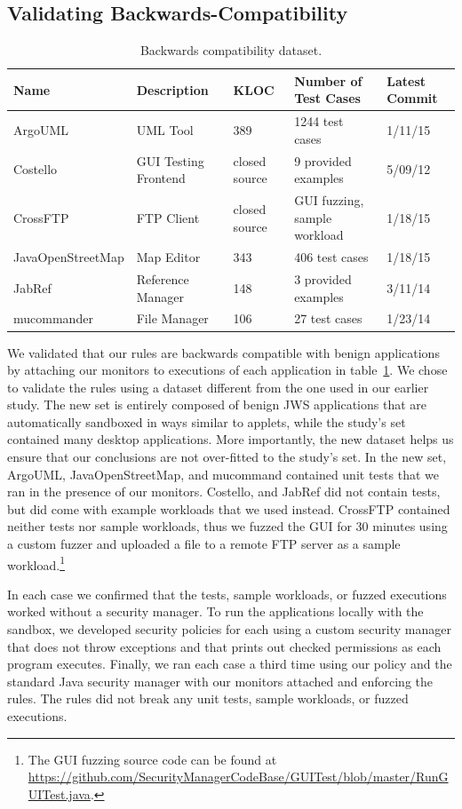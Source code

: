 \documentclass{sig-alternate}
\begin{document}
\subsection{Validating Backwards-Compatibility}\label{sec:backcompat}
\begin{table}
\caption{\label{tab:validation-programs}
Backwards compatibility dataset.}
\centering

\begin{tabular}{lllll}
\toprule 
\textbf{Name} & \textbf{Description} & \textbf{KLOC} & \textbf{Number of Test Cases} & \textbf{Latest Commit}\tabularnewline
\midrule
ArgoUML & UML Tool & 389 & 1244 test cases & 1/11/15 \tabularnewline
Costello & GUI Testing Frontend & closed source & 9 provided examples & 5/09/12 \tabularnewline
CrossFTP & FTP Client & closed source & GUI fuzzing, sample workload & 1/18/15 \tabularnewline
JavaOpenStreetMap & Map Editor & 343 & 406 test cases & 1/18/15 \tabularnewline
JabRef & Reference Manager & 148 & 3 provided examples & 3/11/14 \tabularnewline 
mucommander & File Manager & 106 & 27 test cases & 1/23/14 \tabularnewline
\bottomrule
\end{tabular}
\vspace{-0.5cm}
\end{table}

We validated that our rules are backwards compatible with benign applications by
attaching our monitors to executions of each application in
table~\ref{tab:validation-programs}. We chose to validate the rules using a dataset different from the one used in our earlier study. The new set is entirely composed of benign JWS applications that are automatically sandboxed in ways similar to applets, while the study's set contained many desktop applications. More importantly, the new dataset helps us ensure that our conclusions are not over-fitted to the study's set. In the new set, ArgoUML, JavaOpenStreetMap, and mucommand
contained unit tests that we ran in the presence of our monitors. Costello, and
JabRef did not contain tests, but did come with example workloads that we used
instead. CrossFTP contained neither tests nor sample workloads, thus we fuzzed
the GUI for 30 minutes using a custom fuzzer and uploaded a file to a remote FTP
server as a sample workload.\footnote{The GUI fuzzing source code can be found at \url{https://github.com/SecurityManagerCodeBase/GUITest/blob/master/RunGUITest.java}.}

In each case we confirmed that the tests, sample workloads, or fuzzed executions
worked without a security manager. To run the applications locally with the sandbox, we developed security
policies for each using a custom security manager that does not throw exceptions and that prints out checked permissions as each program executes. Finally, we ran each case a third time
using our policy and the standard Java security manager with our monitors
attached and enforcing the rules. The rules did not break any unit tests, sample
workloads, or fuzzed executions.
\end{document}
